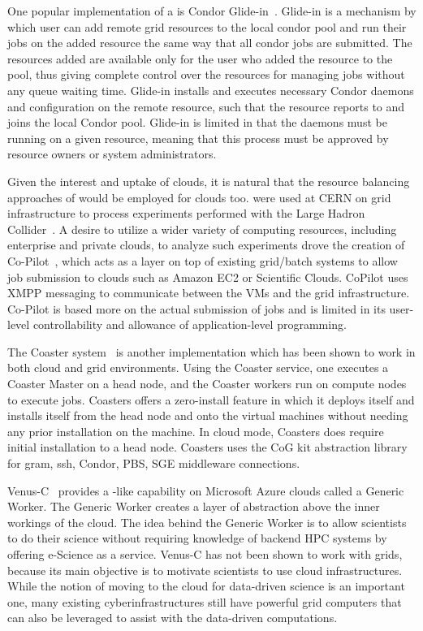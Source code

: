 \documentclass{sig-alternate}
\begin{document}
One popular implementation of a \pilotjob is Condor Glide-in~\cite{glidein}. Glide-in is a mechanism by which user can add remote grid resources to the local condor pool and run their jobs on the added resource the same way that all condor jobs are submitted. The resources added are available only for the user who added the resource to the pool, thus giving complete control over the resources for managing jobs without any queue waiting time. Glide-in installs and executes necessary Condor daemons and configuration on the remote resource, such that the resource reports to and joins the local Condor pool. Glide-in is limited in that the daemons must be running on a given resource, meaning that this process must be approved by resource owners or system administrators. 

Given the interest and uptake of clouds, it is natural that the resource
balancing approaches of \pilotjobs would be employed for clouds too.
\pilotjobs were used at CERN on grid infrastructure to process experiments 
performed with the Large Hadron Collider~\cite{copilot-tr}. 
A desire to utilize a wider variety of computing resources, including enterprise and private clouds, to analyze such experiments drove the creation 
of  Co-Pilot~\cite{copilot-tr}, which acts as a layer on top of existing
grid/batch systems to allow job submission to clouds such as Amazon
EC2 or Scientific Clouds. CoPilot uses XMPP messaging to communicate between
the VMs and the grid infrastructure. Co-Pilot is based more on the actual
submission of jobs and is limited in its user-level controllability and 
allowance of application-level programming.

The Coaster system~\cite{coasters} is another \pilotjob implementation
which has been shown to work in both cloud and grid
environments. Using the Coaster service, one executes a Coaster Master
on a head node, and the Coaster workers run on compute nodes to
execute jobs. Coasters offers a zero-install feature in which it
deploys itself and installs itself from the head node and onto the
virtual machines without needing any prior installation on the
machine. In cloud mode, Coasters does require initial installation to
a head node. Coasters uses the CoG kit abstraction library for gram,
ssh, Condor, PBS, SGE middleware connections.
 
Venus-C~\cite{venusc-generic-worker} provides a \pilotjob-like
capability on Microsoft Azure clouds called a Generic Worker. The
Generic Worker creates a layer of abstraction above the inner workings
of the cloud.  The idea behind the Generic Worker is to allow
scientists to do their science without requiring knowledge of backend
HPC systems by offering e-Science as a service. Venus-C has not been
shown to work with grids, because its main objective is to motivate
scientists to use cloud infrastructures.  While the notion of moving
to the cloud for data-driven science is an important one, many
existing cyberinfrastructures still have powerful grid computers that
can also be leveraged to assist with the data-driven computations.
\end{document}

